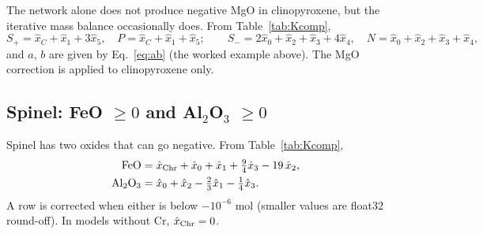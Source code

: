 \documentclass[11pt]{article}
\begin{document}
The network alone does not produce negative MgO in clinopyroxene, but the iterative mass
balance occasionally does. From Table~\ref{tab:Kcomp},
\begin{equation}
  S_+ = \hat x_C + \hat x_1 + 3\hat x_5, \quad P = \hat x_C + \hat x_1 + \hat x_5; \qquad
  S_- = 2\hat x_0 + \hat x_2 + \hat x_3 + 4\hat x_4, \quad N = \hat x_0 + \hat x_2 + \hat x_3 + \hat x_4,
\end{equation}
and $a$, $b$ are given by Eq.~\eqref{eq:ab} (the worked example above). The MgO correction
is applied to clinopyroxene only.

\subsection{Spinel: FeO $\ge 0$ and Al$_2$O$_3$ $\ge 0$}

Spinel has two oxides that can go negative. From Table~\ref{tab:Kcomp},
\begin{align}
  \text{FeO} &= \hat x_{\rm Chr} + \hat x_0 + \hat x_1 + \tfrac94\hat x_3 - 19\,\hat x_2, \label{eq:spFe}\\
  \text{Al}_2\text{O}_3 &= \hat x_0 + \hat x_2 - \tfrac23\hat x_1 - \tfrac14\hat x_3 . \label{eq:spAl}
\end{align}
A row is corrected when either is below $-10^{-6}$ mol (smaller values are float32
round-off). In models without Cr, $\hat x_{\rm Chr} = 0$.
\end{document}
